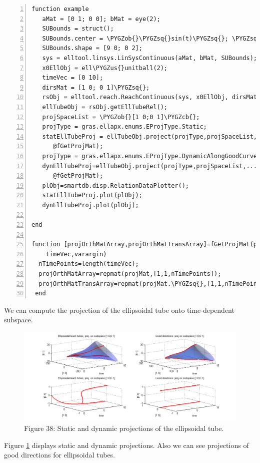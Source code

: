 \documentclass[letterpaper,10pt,english]{sphinxmanual}
\def\PYGZus{\char`\_}
\def\PYGZob{\char`\{}
\def\PYGZcb{\char`\}}
\def\PYGZsq{\char`\'}
\begin{document}
\begin{Verbatim}[commandchars=\\\{\},numbers=left,firstnumber=1,stepnumber=1]
function example
   aMat = [0 1; 0 0]; bMat = eye(2);  
   SUBounds = struct();
   SUBounds.center = \PYGZob{}\PYGZsq{}sin(t)\PYGZsq{}; \PYGZsq{}cos(t)\PYGZsq{}\PYGZcb{};  
   SUBounds.shape = [9 0; 0 2]; 
   sys = elltool.linsys.LinSysContinuous(aMat, bMat, SUBounds);
   x0EllObj = ell\PYGZus{}unitball(2);
   timeVec = [0 10]; 
   dirsMat = [1 0; 0 1]\PYGZsq{};  
   rsObj = elltool.reach.ReachContinuous(sys, x0EllObj, dirsMat, timeVec);
   ellTubeObj = rsObj.getEllTubeRel();
   projSpaceList = \PYGZob{}[1 0;0 1]\PYGZcb{};
   projType = gras.ellapx.enums.EProjType.Static;
   statEllTubeProj = ellTubeObj.project(projType,projSpaceList,...
      @fGetProjMat);
   projType = gras.ellapx.enums.EProjType.DynamicAlongGoodCurve;
   dynEllTubeProj=ellTubeObj.project(projType,projSpaceList,...
      @fGetProjMat);
   plObj=smartdb.disp.RelationDataPlotter();
   statEllTubeProj.plot(plObj);
   dynEllTubeProj.plot(plObj);

end

function [projOrthMatArray,projOrthMatTransArray]=fGetProjMat(projMat,...
    timeVec,varargin)
  nTimePoints=length(timeVec);
  projOrthMatArray=repmat(projMat,[1,1,nTimePoints]);
  projOrthMatTransArray=repmat(projMat.\PYGZsq{},[1,1,nTimePoints]);
 end
\end{Verbatim}
\label{chap_implement:goto-label}
We can compute the projection of the ellipsoidal
tube onto time-dependent subspace.
\begin{figure}[htbp]
\centering
\capstart

\includegraphics[width=1.000\linewidth]{chapter05_section03_reachTubeStatProjreachTubeDynProj.png}
\caption{Figure 38: Static and dynamic projections of the ellipsoidal tube.}\label{chap_implement:statdyn-proj}\end{figure}

Figure \hyperref[chap_implement:statdyn-proj]{ \ref*{chap_implement:statdyn-proj}} displays static and dynamic projections.
Also we can see projections of good directions for ellipsoidal tubes.
\end{document}
